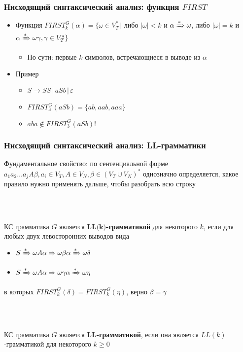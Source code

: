 \documentclass{beamer}
\newcommand{\derive}[0]{\xRightarrow[]{*}}
\begin{document}
\begin{frame}[fragile]
  \transwipe[direction=90]
  \frametitle{Нисходящий синтаксический анализ: функция $FIRST$}
  \begin{itemize}
      \item Функция $FIRST^G_k(\alpha) = \{ \omega \in V_T^* \, |$ либо $|\omega| < k$ и $ \alpha \derive \omega$, либо $|\omega| = k$ и $\alpha \derive \omega \gamma, \gamma \in V_T^*\}$
      \begin{itemize}
        \item По сути: первые $k$ символов, встречающиеся в выводе из $\alpha$
      \end{itemize}
      \item Пример
      \begin{itemize}
        \item $S \rightarrow S S \, | \, a S b \, | \, \varepsilon$
        \item $FIRST^G_3( a S b ) = \{ ab, aab, aaa\} $
        \item $aba \notin FIRST^G_3 (a S b)$!
      \end{itemize}    
  \end{itemize}
\end{frame}


\begin{frame}[fragile]
  \transwipe[direction=90]
  \frametitle{Нисходящий синтаксический анализ: LL-грамматики}
    Фундаментальное свойство: по сентенциальной форме $a_1 a_2 \dots a_j A \beta, a_i \in V_T, A \in V_N, \beta \in (V_T \cup V_N)^*$ однозначно определяется, какое правило нужно применять дальше, чтобы разобрать всю строку \pause
    
    ~\\~
      
   КС грамматика $G$ является $\textbf{LL(k)}$\textbf{-грамматикой} для некоторого $k$,  если для любых двух левосторонних выводов вида 
  \begin{itemize}
    \item $S \derive \omega A \alpha \Rightarrow \omega \beta \alpha \derive \omega \delta$
    \item $S \derive \omega A \alpha \Rightarrow \omega \gamma \alpha \derive \omega \eta$
  \end{itemize}
  в которых $FIRST^G_k(\delta) = FIRST ^G_k(\eta)$, верно $\beta = \gamma$

~\\~

  КС грамматика $G$ является $\textbf{LL}$\textbf{-грамматикой}, если она является $LL(k)$-грамматикой для некоторого $k \geq 0$
\end{frame}
\end{document}
